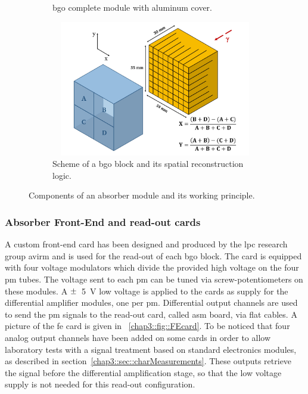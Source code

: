 \begin{figure}
\begin{subfigure}[t]{.5\textwidth}
\caption{\gls{bgo} complete module with aluminum cover.}
\label{chap3::fig::originalBlock_withAl}
\end{subfigure}
\begin{subfigure}[t]{.5\textwidth}
\centering
\includegraphics[width=1\textwidth, height=16em]{03_GraphicFiles/chapter3_CLaRySproto/Absorber/block_scheme.pdf}
\caption{Scheme of a \gls{bgo} block and its spatial reconstruction logic.}
\label{chap3::fig::BGOblockScheme} 
\end{subfigure}
\caption{Components of an absorber module and its working principle.}
\label{chap5::fig::BGO_block}
\end{figure}


\subsubsection{Absorber Front-End and read-out cards}\label{chap3::subsubsec::AbsorberFEcard}
A custom front-end card has been designed and produced by the \gls{lpc} research group \gls{avirm} and is used for the read-out of each \gls{bgo} block. The card is equipped with four voltage modulators which divide the provided high voltage on the four \gls{pm} tubes. The voltage sent to each \gls{pm} can be tuned via screw-potentiometers on these modules. A $\varpm$~5~V low voltage is applied to the cards as supply for the differential amplifier modules, one per \gls{pm}. Differential output channels are used to send the \gls{pm} signals to the read-out card, called \gls{asm} board, via flat cables. A picture of the \gls{fe} card is given in \figurename~\ref{chap3::fig::FEcard}. To be noticed that four analog output channels have been added on some cards in order to allow laboratory tests with a signal treatment based on standard electronics modules, as described in section~\ref{chap3::sec::charMeasurements}. These outputs retrieve the signal before the differential amplification stage, so that the low voltage supply is not needed for this read-out configuration.

